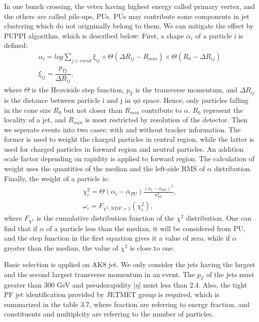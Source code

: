 In one bunch crossing, the vetex having highest energy called primary vertex, and the others are called pile-ups, PUs. PUs may contribute some components in jet clustering which do not origninally belong to them. We can mitigate the effect by PUPPI algorithm, which is described below:
First, a shape $\alpha _{i}$ of a particle i is defined: 
\begin{equation} \label{eq2}
\begin{split}
\alpha_i = log \sum\limits_{j\in event} \xi _{ij} \times \Theta(\Delta R_{ij} - R_{min}) \times \Theta(R_0 - \Delta R_{ij}) \\
\xi _{ij} = \dfrac{p_{Tj}}{\Delta R_{ij}}, 
\end{split}
\end{equation}
where $\Theta$ is the Heaviside step function, $p_{T}$ is the transverse momentum, and $\Delta R_{ij}$ is the distance between particle i and j in $\eta \phi$ space. Hence, only particles falling in the cone size $R_0$ but not closer than $R_{min}$ contribute to $\alpha $. $R_0$ represent the locality of a jet, and $R_{min}$ is most restricted by resolution of the detector. Then we seperate events into two cases: with and without tracker information. The former is used to weight the charged particles in central region, while the latter is used for charged particles in forward region and neutral particles. An addition scale factor depending on rapidity is applied to forward region. The calculation of weight uses the quantities of the median and the left-side RMS of $\alpha $ distribution. Finally, the weight of a particle is: 
\begin{equation} \label{eq3}
\begin{split}
\chi ^2_{i} = \Theta(\alpha _i - \bar{\alpha } _{PU}) \frac{ ( \alpha _i - \bar{\alpha } _{PU})^2 }{\sigma ^2 _{PU}} , \\
\omega _i = F_{\chi ^2,NDF=1}(\chi ^2_i), 
\end{split}
\end{equation}
where $F_{\chi ^2}$ is the cumulative distribution function of the $\chi ^2$ distribution. One can find that if $\alpha $ of a particle less than the median, it will be considered from PU, and the step function in the first equation gives it a value of zero, while if $\alpha $ greater than the median, the value of $\chi  ^2$ is close to one. 

Basic selection is applied on AK8 jet. We only consider the jets having the largest and the second largest transverse momentum in an event. The $p_{T}$ of the jets must greater than 300 GeV and pseudorapidity |$\eta$| must less than 2.4. Also, the tight PF jet identification provided by JETMET group is required, which is summarized in the table 3.7, where fraction are referring to energy fraction, and constituents and multiplcity are referring to the number of particles.

